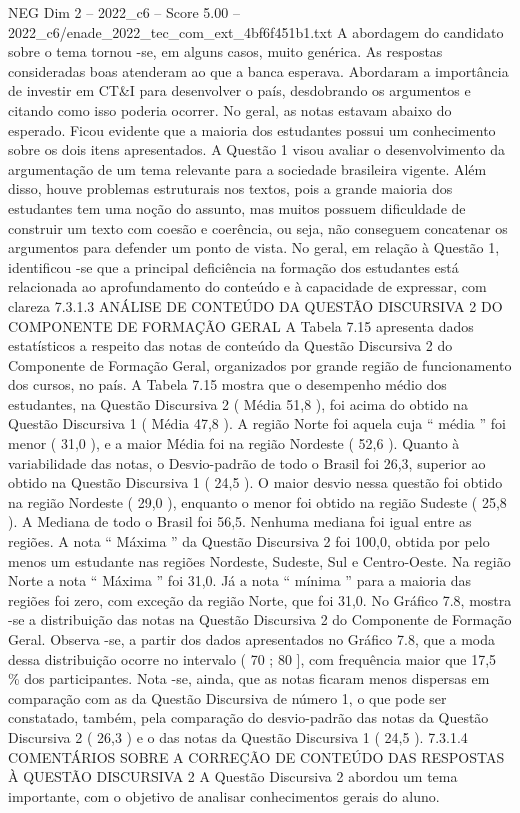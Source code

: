 \begin{textsample}{NEG Dim 2 – 2022\_c6 – Score 5.00 – 2022\_c6/enade\_2022\_tec\_com\_ext\_4bf6f451b1.txt}
A abordagem do candidato sobre o tema tornou -se, em alguns casos, muito genérica.
As respostas consideradas boas atenderam ao que a banca esperava.
Abordaram a importância de investir em CT\&I para desenvolver o país, desdobrando os argumentos e citando como isso poderia ocorrer.
No geral, as notas estavam abaixo do esperado.
Ficou evidente que a maioria dos estudantes possui um conhecimento sobre os dois itens apresentados.
A Questão 1 visou avaliar o desenvolvimento da argumentação de um tema relevante para a sociedade brasileira vigente.
Além disso, houve problemas estruturais nos textos, pois a grande maioria dos estudantes tem uma noção do assunto, mas muitos possuem dificuldade de construir um texto com coesão e coerência, ou seja, não conseguem concatenar os argumentos para defender um ponto de vista.
No geral, em relação à Questão 1, identificou -se que a principal deficiência na formação dos estudantes está relacionada ao aprofundamento do conteúdo e à capacidade de expressar, com clareza 7.3.1.3 ANÁLISE DE CONTEÚDO DA QUESTÃO DISCURSIVA 2 DO COMPONENTE DE FORMAÇÃO GERAL A Tabela 7.15 apresenta dados estatísticos a respeito das notas de conteúdo da Questão Discursiva 2 do Componente de Formação Geral, organizados por grande região de funcionamento dos cursos, no país.
A Tabela 7.15 mostra que o desempenho médio dos estudantes, na Questão Discursiva 2 ( Média 51,8 ), foi acima do obtido na Questão Discursiva 1 ( Média 47,8 ).
A região Norte foi aquela cuja “ média ” foi menor ( 31,0 ), e a maior Média foi na região Nordeste ( 52,6 ).
Quanto à variabilidade das notas, o Desvio-padrão de todo o Brasil foi 26,3, superior ao obtido na Questão Discursiva 1 ( 24,5 ).
O maior desvio nessa questão foi obtido na região Nordeste ( 29,0 ), enquanto o menor foi obtido na região Sudeste ( 25,8 ).
A Mediana de todo o Brasil foi 56,5.
Nenhuma mediana foi igual entre as regiões.
A nota “ Máxima ” da Questão Discursiva 2 foi 100,0, obtida por pelo menos um estudante nas regiões Nordeste, Sudeste, Sul e Centro-Oeste.
Na região Norte a nota “ Máxima ” foi 31,0.
Já a nota “ mínima ” para a maioria das regiões foi zero, com exceção da região Norte, que foi 31,0.
No Gráfico 7.8, mostra -se a distribuição das notas na Questão Discursiva 2 do Componente de Formação Geral.
Observa -se, a partir dos dados apresentados no Gráfico 7.8, que a moda dessa distribuição ocorre no intervalo ( 70 ; 80 ], com frequência maior que 17,5 \% dos participantes.
Nota -se, ainda, que as notas ficaram menos dispersas em comparação com as da Questão Discursiva de número 1, o que pode ser constatado, também, pela comparação do desvio-padrão das notas da Questão Discursiva 2 ( 26,3 ) e o das notas da Questão Discursiva 1 ( 24,5 ). 7.3.1.4 COMENTÁRIOS SOBRE A CORREÇÃO DE CONTEÚDO DAS RESPOSTAS À QUESTÃO DISCURSIVA 2 A Questão Discursiva 2 abordou um tema importante, com o objetivo de analisar conhecimentos gerais do aluno.

\end{textsample}
